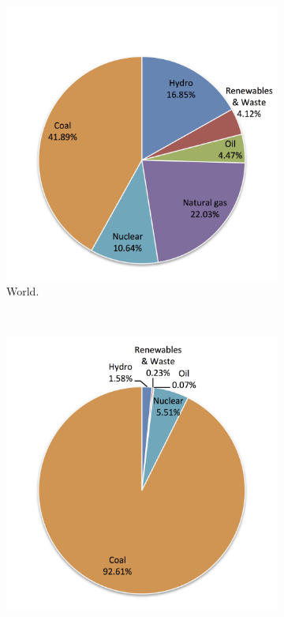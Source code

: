 \begin{figure}[!htbp]
        \centering                
        \begin{subfigure}[b]{0.45\textwidth}
                \centering
                \includegraphics[width=1\textwidth]{FIG/ElectrWorld}
                \caption{World.}\label{ElectrWorld}
        \end{subfigure}
        ~
        \begin{subfigure}[b]{0.45\textwidth}
                \centering
                \includegraphics[width=1\textwidth]{FIG/ElectrSA}

\end{subfigure}
\end{figure}
